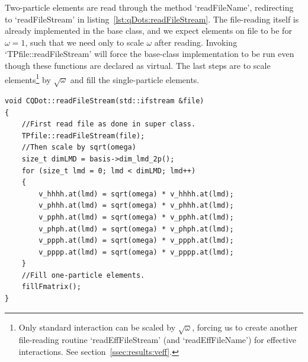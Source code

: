 Two-particle elements are read through the method `readFileName', redirecting to `readFileStream' in listing~\ref{lst:qDots:readFileStream}.
The file-reading itself is already implemented in the base class, and we expect elements on file to be for $\omega=1$, such that we need only to scale $\omega$ after reading.
Invoking `TPfile::readFileStream' will force the base-class implementation to be run even though these functions are declared as virtual.
The last steps are to scale elements\footnote{Only standard interaction can be scaled by $\sqrt{\omega}$, forcing us to create another file-reading routine `readEffFileStream' (and `readEffFileName') for effective interactions. See section~\ref{ssec:results:veff}.} by $\sqrt{\omega}$ and fill the single-particle elements.
\begin{lstlisting}[float,label={lst:qDots:readFileStream},caption={How to read tp-elements for CQDot.}]
void CQDot::readFileStream(std::ifstream &file)
{
    //First read file as done in super class.
    TPfile::readFileStream(file);
    //Then scale by sqrt(omega)
    size_t dimLMD = basis->dim_lmd_2p();
    for (size_t lmd = 0; lmd < dimLMD; lmd++)
    {
        v_hhhh.at(lmd) = sqrt(omega) * v_hhhh.at(lmd);
        v_phhh.at(lmd) = sqrt(omega) * v_phhh.at(lmd);
        v_pphh.at(lmd) = sqrt(omega) * v_pphh.at(lmd);
        v_phph.at(lmd) = sqrt(omega) * v_phph.at(lmd);
        v_ppph.at(lmd) = sqrt(omega) * v_ppph.at(lmd);
        v_pppp.at(lmd) = sqrt(omega) * v_pppp.at(lmd);
    }
    //Fill one-particle elements.
    fillFmatrix();
}
\end{lstlisting}



